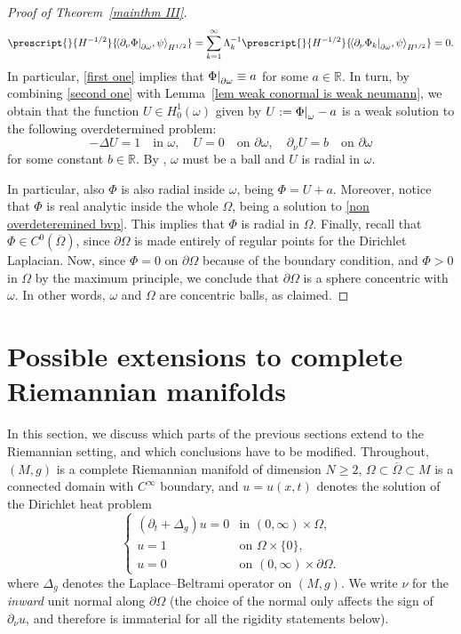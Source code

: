 \documentclass[a4paper,11pt]{article}
\newcommand\restr[2]{{%
\left.\kern-\nulldelimiterspace %
#1 %
\vphantom{|} %
\right|_{#2} %
}}
\newcommand{\Pairing}[2]{
 \prescript{}{{H^{-1/2}}}{\!\left\langle #1, #2\right\rangle_{H^{1/2}}}
 } %
\newcommand{\om}{\omega}
\numberwithin{equation}{section}
\begin{document}
\begin{proof}[Proof of Theorem~\ref{mainthm III}]
\begin{eqnarray}
 \label{second one}
\Pairing{\partial_\nu \restr{\Phi}{\partial\om}}{\psi} = \sum_{k=1}^\infty \Lambda_k^{-1} \Pairing{\partial_\nu \restr{\Phi_k}{\partial\omega}}{\psi}=0.   
\end{eqnarray}  
In particular, \eqref{first one} implies that $\restr{\Phi}{\partial\omega}\equiv a$ for some $a\in\mathbb{R}$. 
In turn, by combining \eqref{second one} with Lemma~\ref{lem weak conormal is weak neumann}, we obtain that the function $U\in H_0^1(\omega)$ given by $U:=\restr{\Phi}{\om}-a$ is a weak solution to the following overdetermined problem: 
\begin{equation*}
    -\Delta U=1\quad \text{in }\omega,\quad U=0\quad \text{on }\partial\omega, \quad \partial_\nu U=b\quad \text{on }\partial\omega
\end{equation*}
for some constant $b\in \mathbb{R}$. By \cite{figalli&zhang2025_serrin_rough_domains}, $\omega$ must be a ball and $U$ is radial in $\omega$.

In particular, also $\Phi$ is also radial inside $\omega$, being $\Phi=U+a$.
Moreover, notice that $\Phi$ is real analytic inside the whole $\Omega$, being a solution to \eqref{non overdeteremined bvp}. This implies that $\Phi$ is radial in $\Omega$. 
Finally, recall that $\Phi\in C^0(\overline{\Omega})$, since $\partial\Omega$ is made entirely of regular points for the Dirichlet Laplacian. Now, since $\Phi=0$ on $\partial\Omega$ because of the boundary condition, and $\Phi>0$ in $\Omega$ by the maximum principle, we conclude that $\partial\Omega$ is a sphere concentric with $\omega$. In other words, $\omega$ and $\Omega$ are concentric balls, as claimed.  
\end{proof}

\section{Possible extensions to complete Riemannian manifolds}\label{section manifolds}


In this section, we discuss which parts of the previous sections extend to the
Riemannian setting, and which conclusions have to be modified. Throughout,
$(M, g)$ is a complete Riemannian manifold of dimension $N\ge 2$, $\Omega\subset \overline{\Omega}\subset M$ is a connected
domain with $C^\infty$ boundary, and $u=u(x,t)$ denotes the solution of the
Dirichlet heat problem 
\begin{equation}\label{eq:heat-riem}
\begin{cases}
(\partial_t+\Delta_g)u=0 & \text{in } (0,\infty)\times \Omega,\\
u=1 & \text{on } \Omega\times\{0\},\\
u=0 & \text{on } (0,\infty)\times \partial\Omega.
\end{cases}
\end{equation}
where $\Delta_g$ denotes the Laplace--Beltrami operator on $(M, g)$.
We write $\nu$ for the \emph{inward} unit normal along $\partial\Omega$ (the
choice of the normal only affects the sign of $\partial_\nu u$, and therefore
is immaterial for all the rigidity statements below).
\end{document}
